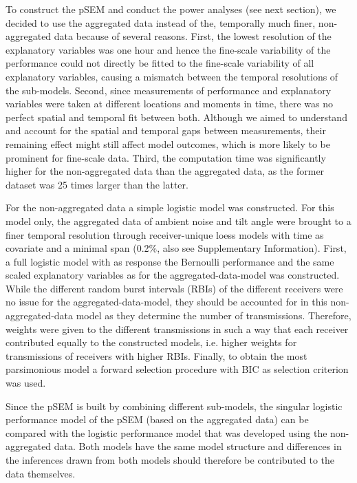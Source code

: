 \documentclass[doublespacing,linenumbers]{bmcart}
\begin{document}
To construct the pSEM and conduct the power analyses (see next section), we decided to use the aggregated data instead of the, temporally much finer, non-aggregated data because of several reasons. First, the lowest resolution of the explanatory variables was one hour and hence the fine-scale variability of the performance could not directly be fitted to the fine-scale variability of all explanatory variables, causing a mismatch between the temporal resolutions of the sub-models. Second, since measurements of performance and explanatory variables were taken at different locations and moments in time, there was no perfect spatial and temporal fit between both. Although we aimed to understand and account for the spatial and temporal gaps between measurements, their remaining effect might still affect model outcomes, which is more likely to be prominent for fine-scale data. Third, the computation time was significantly higher for the non-aggregated data than the aggregated data, as the former dataset was 25 times larger than the latter. 

For the non-aggregated data a simple logistic model was constructed. For this model only, the aggregated data of ambient noise and tilt angle were brought to a finer temporal resolution through receiver-unique loess models with time as covariate and a minimal span (0.2\%, also see Supplementary Information). First, a full logistic model with as response the Bernoulli performance and the same scaled explanatory variables as for the aggregated-data-model was constructed. While the different random burst intervals (RBIs) of the different receivers were no issue for the aggregated-data-model, they should be accounted for in this non-aggregated-data model as they determine the number of transmissions. Therefore, weights were given to the different transmissions in such a way that each receiver contributed equally to the constructed models, i.e. higher weights for transmissions of receivers with higher RBIs. Finally, to obtain the most parsimonious model a forward selection procedure with BIC as selection criterion was used.

Since the pSEM is built  by combining different sub-models, the singular logistic performance model of the pSEM (based on the aggregated data) can be compared with the logistic performance model that was developed using the non-aggregated data. Both models have the same model structure and differences in the inferences drawn from both models should therefore be contributed to the data themselves.  
\end{document}

